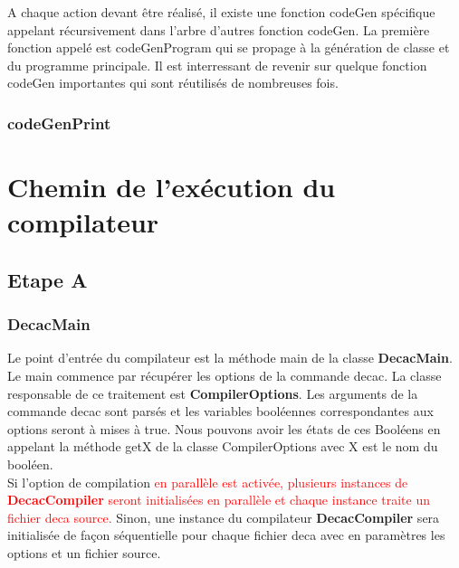 \documentclass[12pt, a4paper, one side]{article}
\begin{document}
    A chaque action devant être réalisé, il existe une fonction codeGen spécifique appelant récursivement dans l'arbre
    d'autres fonction codeGen. La première fonction appelé est codeGenProgram qui se propage à la génération de classe
    et du programme principale. Il est interressant de revenir sur quelque fonction codeGen importantes qui sont réutilisés
    de nombreuses fois.

    \subsubsection{codeGenPrint}

    \section{Chemin de l'exécution du compilateur}
    \subsection{Etape A}

    \subsubsection{DecacMain}
    Le point d'entrée du compilateur est la méthode main de la classe \textbf {DecacMain}. Le main commence par récupérer les options de la commande decac. La classe responsable de ce traitement est \textbf{CompilerOptions}. Les arguments de la commande decac sont parsés et les variables booléennes correspondantes aux options seront à mises à true. Nous pouvons avoir les états de ces Booléens en appelant la méthode getX de la classe CompilerOptions avec X est le nom du booléen.
    \\
    Si l'option de compilation {\textcolor{red}{ en parallèle est activée, plusieurs instances de \textbf{DecacCompiler} seront initialisées en parallèle et chaque instance traite un fichier deca source.}}
    Sinon, une instance du compilateur \textbf{DecacCompiler} sera initialisée de façon séquentielle pour chaque fichier deca avec en paramètres les options et un fichier source.
\end{document}
